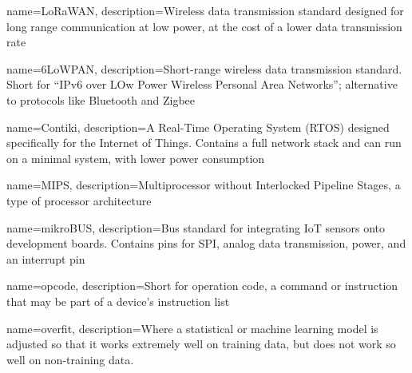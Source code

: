 \makeglossaries

{
  name=LoRaWAN,
  description={Wireless data transmission standard designed for long range communication at low power, at the cost of a lower data transmission rate}
}

{
  name=6LoWPAN,
  description={Short-range wireless data transmission standard. Short for ``IPv6 over LOw Power Wireless Personal Area Networks''; alternative to protocols like Bluetooth and Zigbee}
}

{
  name={Contiki},
  description={A Real-Time Operating System (RTOS) designed specifically for the Internet of Things. Contains a full network stack and can run on a minimal system, with lower power consumption}
}

{
  name={MIPS},
  description={Multiprocessor without Interlocked Pipeline Stages, a type of
  processor architecture}
}

{
  name={mikroBUS},
  description={Bus standard for integrating IoT sensors onto
  development boards. Contains pins for SPI, analog data transmission, power,
  and an interrupt pin}
}

{
  name={opcode},
  description={Short for operation code, a command or instruction that may be part of a device's instruction list}
}

{
  name=overfit,
  description={Where a statistical or machine learning model is adjusted so
  that it works extremely well on training data, but does not work so well on
  non-training data.}
}